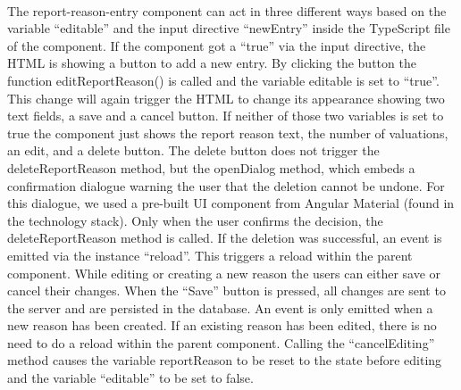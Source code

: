 \vspace{5mm}
\\
The report-reason-entry component can act in three different ways based on the variable \enquote{editable} and the input directive \enquote{newEntry} inside the TypeScript file of the component. If the component got a \enquote{true} via the input directive, the HTML is showing a button to add a new entry. By clicking the button the function editReportReason() is called and the variable editable is set to \enquote{true}. This change will again trigger the HTML to change its appearance showing two text fields, a save and a cancel button. If neither of those two variables is set to true the component just shows the report reason text, the number of valuations, an edit, and a delete button. The delete button does not trigger the deleteReportReason method, but the openDialog method, which embeds a confirmation dialogue warning the user that the deletion cannot be undone. For this dialogue, we used a pre-built UI component from Angular Material (found in the technology stack). Only when the user confirms the decision, the deleteReportReason method is called. If the deletion was successful, an event is emitted via the instance \enquote{reload}.
This triggers a reload within the parent component. While editing or creating a new reason the users can either save or cancel their changes. When the \enquote{Save} button is pressed, all changes are sent to the server and are persisted in the database. An event is only emitted when a new reason has been created. If an existing reason has been edited, there is no need to do a reload within the parent component. Calling the \enquote{cancelEditing} method causes the variable reportReason to be reset to the state before editing and the variable
\enquote{editable} to be set to false.

